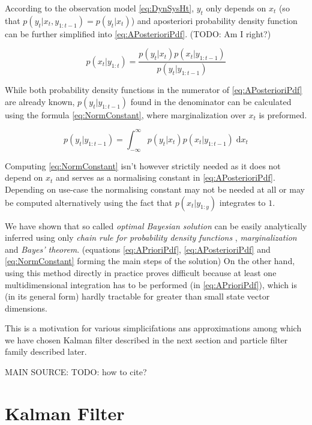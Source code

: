\documentclass[a4paper,12pt,oneside]{report}
\newcommand{\pdf}{probability density function }
\newcommand{\pdfs}{probability density functions }
\begin{document}
According to the observation model \eqref{eq:DynSysHt}, \(y_t\) only depends on \(x_t\) (so that
\(p(y_t | x_t, y_{1:t-1}) = p(y_t | x_t)\)) and aposteriori \pdf can be further simplified into
\eqref{eq:APosterioriPdf}. (TODO: Am I right?)

\begin{equation} \label{eq:APosterioriPdf}
	p(x_t | y_{1:t}) = \frac{p(y_t | x_t) p(x_t | y_{1:t-1})}{p(y_t | y_{1:t-1})}
\end{equation}

While both \pdfs in the numerator of \eqref{eq:APosterioriPdf} are already known, \(p(y_t|y_{1:t-1})\)
found in the denominator can be calculated using the formula \eqref{eq:NormConstant}, where
marginalization over \(x_t\) is preformed.

\begin{equation} \label{eq:NormConstant}
	p(y_t | y_{1:t-1}) = \int_{-\infty}^{\infty} p(y_t | x_t) p(x_t | y_{1:t-1}) \; \mathrm{d} x_{t}
\end{equation}

Computing \eqref{eq:NormConstant} isn't however strictily needed as it does not depend on \(x_t\) and
serves as a normalising constant in \eqref{eq:APosterioriPdf}. Depending on use-case the normalising
constant may not be needed at all or may be computed alternatively using the fact that \(p(x_t | y_{1:y})\)
integrates to \(1\).

We have shown that so called \emph{optimal Bayesian solution} can be easily analytically inferred
using only \emph{chain rule for \pdfs}, \emph{marginalization} and \emph{Bayes' theorem}. (equations
\eqref{eq:APrioriPdf}, \eqref{eq:APosterioriPdf} and \eqref{eq:NormConstant} forming the main steps of the
solution) On the other hand, using this
method directly in practice proves difficult because at least one multidimensional integration has
to be performed (in \eqref{eq:APrioriPdf}), which is (in its general form) hardly tractable for
greater than small state vector dimensions.

This is a motivation for various simplicifations ans approximations among which we have chosen
Kalman filter described in the next section and particle filter family described later.

MAIN SOURCE: \cite{AruMasGor:02} TODO: how to cite?

\section{Kalman Filter}
\end{document}
